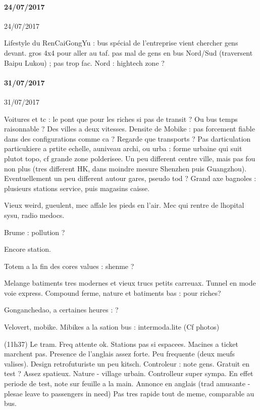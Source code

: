 \paragraph{24/07/2017}{24/07/2017}

Lifestyle du RenCaiGongYu : bus spécial de l'entreprise vient chercher gens devant. gros 4x4 pour aller au taf. pas mal de gens en bus Nord/Sud (traversent Baipu Lukou) ; pas trop fac. Nord : hightech zone ?




\paragraph{31/07/2017}{31/07/2017}

Voitures et tc : le pont que pour les riches si pas de transit ? Ou bus temps raisonnable ?
Des villes a deux vitesses.
Densite de Mobike : pas forcement fiable dans des configurations comme ca ?
Regarde que transports ? Pas darticulation particukiere a prtite echelle, auniveau archi, ou urba : forme urbaine qui suit plutot topo, cf grande zone polderisee. Un peu different centre ville, mais pas fou non plus (tres different HK, dans moindre mesure Shenzhen puis Guangzhou). Eventuellement un peu different autour gares, pseudo tod ?
Grand axe bagnoles : plusieurs stations service, puis magasins caisse.

Vieux weird, gueulent, mec affale les pieds en l'air.
Mec qui rentre de lhopital sysu, radio medocs.

Brume : pollution ?

Encore station.

Totem a la fin des cores values : shenme ?

Melange batiments tres modernes et vieux trucs petits carreuax.
Tunnel en mode voie express. Compound ferme, nature et batiments bas : pour riches?

Gonganchedao, a certaines heures : ?

Velovert, mobike.
Mibikes a la sation bus : intermoda.lite
(Cf photos)


(11h37)
Le tram. Freq attente ok. Stations pas si espacees. Macines a ticket marchent pas. Presence de l'anglais assez forte.
Peu frequente (deux meufs valises).
Design retrofuturiste un peu kitsch.
Controleur : note gens. Gratuit en test ?
Assez spatieux.
Nature - village urbain.
Controlleur super sympa. En effet periode de test, note sur feuille a la main.
Annonce en anglais (trad amusante - plesae leave to passengers in need)
Pas tres rapide tout de meme, comparable au bus.

